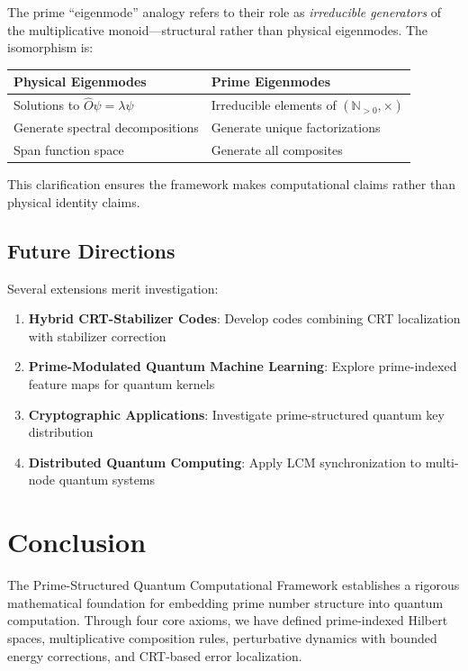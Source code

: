 \documentclass[12pt,a4paper]{article}
\begin{document}
The prime ``eigenmode'' analogy refers to their role as \emph{irreducible generators} of the multiplicative monoid---structural rather than physical eigenmodes. The isomorphism is:

\begin{center}
\begin{tabular}{ll}
\toprule
\textbf{Physical Eigenmodes} & \textbf{Prime Eigenmodes} \\
\midrule
Solutions to $\hat{O}\psi = \lambda\psi$ & Irreducible elements of $(\mathbb{N}_{>0}, \times)$ \\
Generate spectral decompositions & Generate unique factorizations \\
Span function space & Generate all composites \\
\bottomrule
\end{tabular}
\end{center}

This clarification ensures the framework makes computational claims rather than physical identity claims.

\subsection{Future Directions}

Several extensions merit investigation:

\begin{enumerate}
    \item \textbf{Hybrid CRT-Stabilizer Codes}: Develop codes combining CRT localization with stabilizer correction
    \item \textbf{Prime-Modulated Quantum Machine Learning}: Explore prime-indexed feature maps for quantum kernels
    \item \textbf{Cryptographic Applications}: Investigate prime-structured quantum key distribution
    \item \textbf{Distributed Quantum Computing}: Apply LCM synchronization to multi-node quantum systems
\end{enumerate}

\section{Conclusion}

The Prime-Structured Quantum Computational Framework establishes a rigorous mathematical foundation for embedding prime number structure into quantum computation. Through four core axioms, we have defined prime-indexed Hilbert spaces, multiplicative composition rules, perturbative dynamics with bounded energy corrections, and CRT-based error localization.
\end{document}
